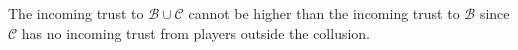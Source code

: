 \begin{proofsketch}
   The incoming trust to $\mathcal{B} \cup \mathcal{C}$ cannot be higher than the incoming trust to $\mathcal{B}$ since
   $\mathcal{C}$ has no incoming trust from players outside the collusion.
\end{proofsketch}

